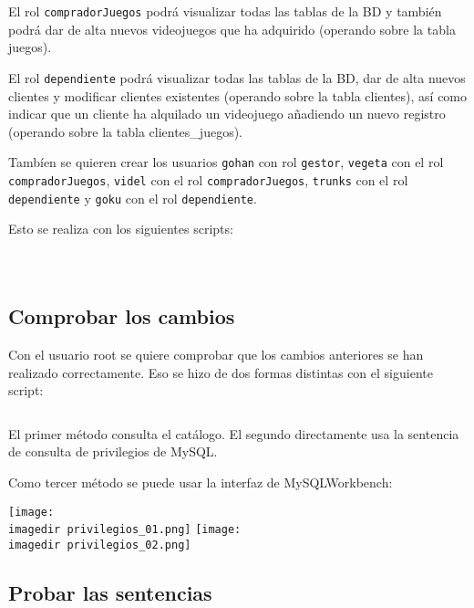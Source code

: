 \documentclass[a4paper, 11pt, oneside]{article} %
\newcommand{\scriptdir}{../scripts/} %
\newcommand{\imagedir}{../images/} %
\begin{document}
El rol \texttt{compradorJuegos} podrá visualizar todas las tablas de la BD y también podrá dar de alta nuevos videojuegos que ha adquirido (operando sobre la tabla juegos).

El rol \texttt{dependiente} podrá visualizar todas las tablas de la BD, dar de alta nuevos clientes y modificar clientes existentes (operando sobre la tabla clientes), así como indicar que un cliente ha alquilado un videojuego añadiendo un nuevo registro (operando sobre la tabla clientes\_juegos).

Tambíen se quieren crear los usuarios \texttt{gohan} con rol \texttt{gestor}, \texttt{vegeta} con el rol \texttt{compradorJuegos}, \texttt{videl} con el rol \texttt{compradorJuegos}, \texttt{trunks} con el rol \texttt{dependiente} y \texttt{goku} con el rol \texttt{dependiente}.

Esto se realiza con los siguientes scripts:

\inputminted{mysql}{\scriptdir scripts_roles/gestor.sql}

\inputminted{mysql}{\scriptdir scripts_roles/comprador_juegos_privileges_and_role_creation.sql}

\inputminted{mysql}{\scriptdir scripts_roles/dependiente_privileges_and_role_creation.sql}

\subsection{Comprobar los cambios}

Con el usuario root se quiere comprobar que los cambios anteriores se han realizado correctamente. Eso se hizo de dos formas distintas con el siguiente script:

\inputminted{mysql}{\scriptdir scripts_consulta_privilegios/check_privileges.sql}

El primer método consulta el catálogo. El segundo directamente usa la sentencia de consulta de privilegios de MySQL.

Como tercer método se puede usar la interfaz de MySQLWorkbench:

\texttt{[image: \\imagedir privilegios\_01.png]}
\texttt{[image: \\imagedir privilegios\_02.png]}

\subsection{Probar las sentencias}
\end{document}
